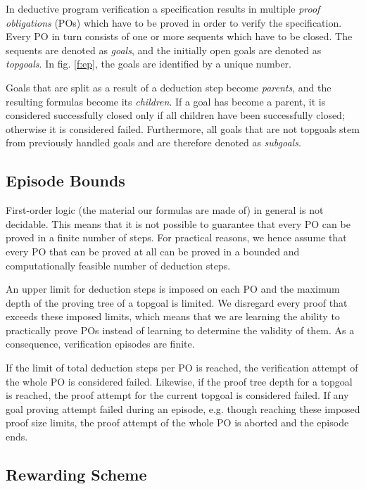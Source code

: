 \documentclass[runningheads,a4paper]{llncs}
\begin{document}
In deductive program verification a specification results in multiple \textit{proof obligations} (POs) which have to be proved in order to verify the specification. Every PO in turn consists of one or more sequents which have to be closed. The sequents are denoted as \textit{goals}, and the initially open goals are denoted as \textit{topgoals}. In fig. \ref{f:ep}, the goals are identified by a unique number.

Goals that are split as a result of a deduction step become \textit{parents}, and the resulting formulas become its \textit{children}. If a goal has become a parent, it is considered successfully closed only if all children have been successfully closed; otherwise it is considered failed. Furthermore, all goals that are not topgoals stem from previously handled goals and are therefore denoted as \textit{subgoals}. 

\subsection*{Episode Bounds}

First-order logic (the material our formulas are made of) in general is not decidable. This means that it is not possible to guarantee that every PO can be proved in a finite number of steps. For practical reasons, we hence assume that every PO that can be proved at all can be proved in a bounded and computationally feasible number of deduction steps.

An upper limit for deduction steps is imposed on each PO and the maximum depth of the proving tree of a topgoal is limited. We disregard every proof that exceeds these imposed limits, which means that we are learning the ability to practically prove POs instead of learning to determine the validity of them. As a consequence, verification episodes are finite.

If the limit of total deduction steps per PO is reached, the verification attempt of the whole PO is considered failed. Likewise, if the proof tree depth for a topgoal is reached, the proof attempt for the current topgoal is considered failed. If any goal proving attempt failed during an episode, e.g. though reaching these imposed proof size limits, the proof attempt of the whole PO is aborted and the episode ends.

\subsection*{Rewarding Scheme}
\end{document}
